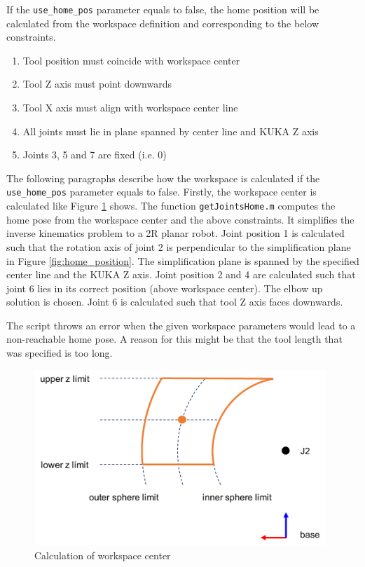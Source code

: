 \documentclass[headsepline,footinclude=false,fontsize=11pt,paper=a4,listof=totoc,bibliography=totoc,BCOR=12mm,DIV=14]{scrbook}
\begin{document}
If the \texttt{use\_home\_pos} parameter equals to false, the home position will be calculated from the workspace definition and corresponding to the below constraints. 

\begin{enumerate}
	\item Tool position must coincide with workspace center
	\item Tool Z axis must point downwards
	\item Tool X axis must align with workspace center line
	\item All joints must lie in plane spanned by center line and KUKA Z axis 
	\item Joints 3, 5 and 7 are fixed (i.e. 0) 
\end{enumerate}

The following paragraphs describe how the workspace is calculated if the \texttt{use\_home\_pos} parameter equals to false. Firstly, the workspace center is calculated like Figure \ref{fig:ws_center} shows. The function \texttt{getJointsHome.m} computes the home pose from the workspace center and the above constraints. It simplifies the inverse kinematics problem to a 2R planar robot. Joint position 1 is calculated such that the rotation axis of joint 2 is perpendicular to the simplification plane in Figure \ref{fig:home_position}. The simplification plane is spanned by the specified center line and the KUKA Z axis. Joint position 2 and 4 are calculated such that joint 6 lies in its correct position (above workspace center). The elbow up solution is chosen. Joint 6 is calculated such that tool Z axis faces downwards.

The script throws an error when the given workspace parameters would lead to a non-reachable home pose. A reason for this might be that the tool length that was specified is too long.

\begin{figure}[h]
    \centering
    \includegraphics[width=11cm]{images/ws_center}
    \caption{Calculation of workspace center}
    \label{fig:ws_center}
\end{figure}
\end{document}
